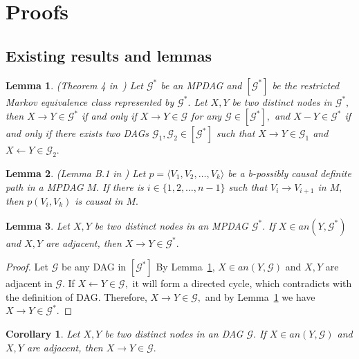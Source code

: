 \documentclass{article}
\newtheorem{lemma}{Lemma}
\newtheorem{corollary}{Corollary}
\begin{document}
\section{Proofs}
\label{append:proof}
\subsection{Existing results and lemmas}

\begin{lemma}
\label{lemma:mpdag def}
(Theorem 4 in~\citet{meek1995causal}) Let $\mathcal{G}^*$ be an MPDAG and $[\mathcal{G}^*]$ be the restricted Markov equivalence class represented by $\mathcal{G}^*.$ Let $X,Y$ be two distinct nodes in $\mathcal{G}^*,$ then $X\to Y\in \mathcal{G}^*$ if and only if $X\to Y\in \mathcal{G}$ for any $\mathcal{G}\in [\mathcal{G}^*],$ and $X-Y\in \mathcal{G}^*$ if and only if there exists two DAGs $\mathcal{G}_1,\mathcal{G}_2\in [\mathcal{G}^*]$ such that $X\to Y\in\mathcal{G}_1$ and $X\leftarrow Y\in \mathcal{G}_2.$
\end{lemma}

\begin{lemma}
\label{lemma: perkovic}
(Lemma B.1 in \citep{perkovic2017interpreting}) Let $p=\langle V_1,V_2,\dots,V_k\rangle$ be a b-possibly causal definite path in a MPDAG $M.$ If there is $i\in \{1,2,\dots,n-1\}$ such that $V_i\to V_{i+1}$ in $M,$ then $p(V_i,V_k)$ is causal in $M.$
\end{lemma}

\begin{lemma}
\label{lemma:partial cycle}
Let $X,Y$ be two distinct nodes in an MPDAG $\mathcal{G}^*.$ If $X \in an(Y,\mathcal{G}^*)$ and $X,Y$ are adjacent, then $X\to Y\in \mathcal{G}^*.$ 
\end{lemma}
\begin{proof}
Let $\mathcal{G}$ be any DAG in $[\mathcal{G}^*]$ By Lemma~\ref{lemma:mpdag def}, $X\in an(Y,\mathcal{G})$ and $X,Y$ are adjacent in $\mathcal{G}.$ If $X\leftarrow Y\in \mathcal{G},$ it will form a directed cycle, which contradicts with the definition of DAG. Therefore, $X\to Y\in \mathcal{G},$ and by Lemma~\ref{lemma:mpdag def} we have $X\to Y\in \mathcal{G}^*.$ 
\end{proof}
\begin{corollary}
\label{cor:partial cycle}
Let $X,Y$ be two distinct nodes in an DAG $\mathcal{G}.$ If $X\in an(Y,\mathcal{G})$ and $X,Y$ are adjacent, then $X\to Y\in \mathcal{G}.$ \qedsymbol
\end{corollary}
\end{document}
